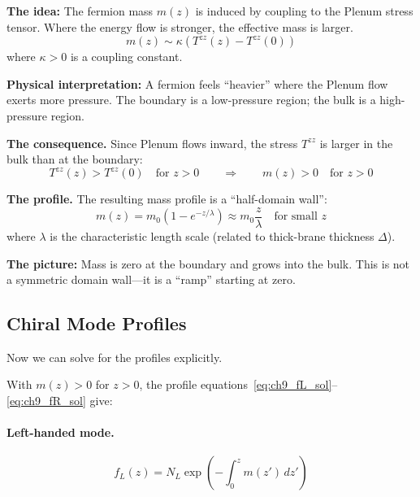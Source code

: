 \begin{tcolorbox}[colback=orange!5, colframe=orange!50!black,
    title=\textbf{Physical Hypothesis [P]}]
\textbf{The idea:} The fermion mass $m(z)$ is induced by coupling to the Plenum
stress tensor. Where the energy flow is stronger, the effective mass is larger.
\begin{equation}
    m(z) \sim \kappa \left( T^{zz}(z) - T^{zz}(0) \right)
    \label{eq:ch9_mass_from_stress}
\end{equation}
where $\kappa > 0$ is a coupling constant.

\textbf{Physical interpretation:} A fermion feels ``heavier'' where the Plenum
flow exerts more pressure. The boundary is a low-pressure region; the bulk
is a high-pressure region.
\end{tcolorbox}

\textbf{The consequence.} Since Plenum flows inward, the stress $T^{zz}$ is
larger in the bulk than at the boundary:
\begin{equation}
    T^{zz}(z) > T^{zz}(0) \quad \text{for } z > 0
    \qquad\Longrightarrow\qquad
    m(z) > 0 \quad \text{for } z > 0
    \label{eq:ch9_mass_positive}
\end{equation}

\textbf{The profile.} The resulting mass profile is a ``half-domain wall'':
\begin{equation}
    m(z) = m_0 \left(1 - e^{-z/\lambda}\right) \approx m_0 \frac{z}{\lambda}
    \quad \text{for small } z
    \label{eq:ch9_mass_profile}
\end{equation}
where $\lambda$ is the characteristic length scale (related to thick-brane
thickness $\Delta$).

\textbf{The picture:} Mass is zero at the boundary and grows into the bulk.
This is not a symmetric domain wall---it is a ``ramp'' starting at zero.

\subsection{Chiral Mode Profiles}

Now we can solve for the profiles explicitly.

With $m(z) > 0$ for $z > 0$, the profile equations~\eqref{eq:ch9_fL_sol}--\eqref{eq:ch9_fR_sol} give:

\paragraph{Left-handed mode.}
\begin{equation}
    f_L(z) = N_L \exp\left(-\int_0^z m(z') \, dz'\right)
    \label{eq:ch9_fL_profile}
\end{equation}

